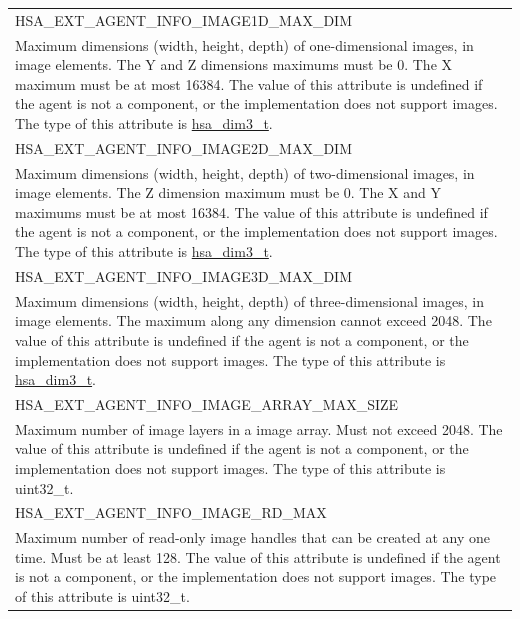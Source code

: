 \documentclass[final,oneside]{book}
\newcommand{\reftyp}[1]{#1}
\newcommand{\refenu}[1]{\reftyp{#1}}
\begin{document}
\begin{longtable}{@{\hspace{2em}}p{\linewidth-2em}}
\hspace{-2em}\refenu{HSA_\-EXT_\-AGENT_\-INFO_\-IMAGE1D_\-MAX_\-DIM}\\Maximum dimensions (width, height, depth) of one-dimensional images, in image elements. The Y and Z dimensions maximums must be 0. The X maximum must be at most 16384. The value of this attribute is undefined if the agent is not a component, or the implementation does not support images. The type of this attribute is \hyperlink{group__common_1ga6f7883588491965c45382cd996351aa2}{hsa_\-dim3_\-t}.\\[2mm]
\hspace{-2em}\refenu{HSA_\-EXT_\-AGENT_\-INFO_\-IMAGE2D_\-MAX_\-DIM}\\Maximum dimensions (width, height, depth) of two-dimensional images, in image elements. The Z dimension maximum must be 0. The X and Y maximums must be at most 16384. The value of this attribute is undefined if the agent is not a component, or the implementation does not support images. The type of this attribute is \hyperlink{group__common_1ga6f7883588491965c45382cd996351aa2}{hsa_\-dim3_\-t}.\\[2mm]
\hspace{-2em}\refenu{HSA_\-EXT_\-AGENT_\-INFO_\-IMAGE3D_\-MAX_\-DIM}\\Maximum dimensions (width, height, depth) of three-dimensional images, in image elements. The maximum along any dimension cannot exceed 2048. The value of this attribute is undefined if the agent is not a component, or the implementation does not support images. The type of this attribute is \hyperlink{group__common_1ga6f7883588491965c45382cd996351aa2}{hsa_\-dim3_\-t}.\\[2mm]
\hspace{-2em}\refenu{HSA_\-EXT_\-AGENT_\-INFO_\-IMAGE_\-ARRAY_\-MAX_\-SIZE}\\Maximum number of image layers in a image array. Must not exceed 2048. The value of this attribute is undefined if the agent is not a component, or the implementation does not support images. The type of this attribute is uint32_\-t.\\[2mm]
\hspace{-2em}\refenu{HSA_\-EXT_\-AGENT_\-INFO_\-IMAGE_\-RD_\-MAX}\\Maximum number of read-only image handles that can be created at any one time. Must be at least 128. The value of this attribute is undefined if the agent is not a component, or the implementation does not support images. The type of this attribute is uint32_\-t.\\[2mm]

\end{longtable}
\end{document}

